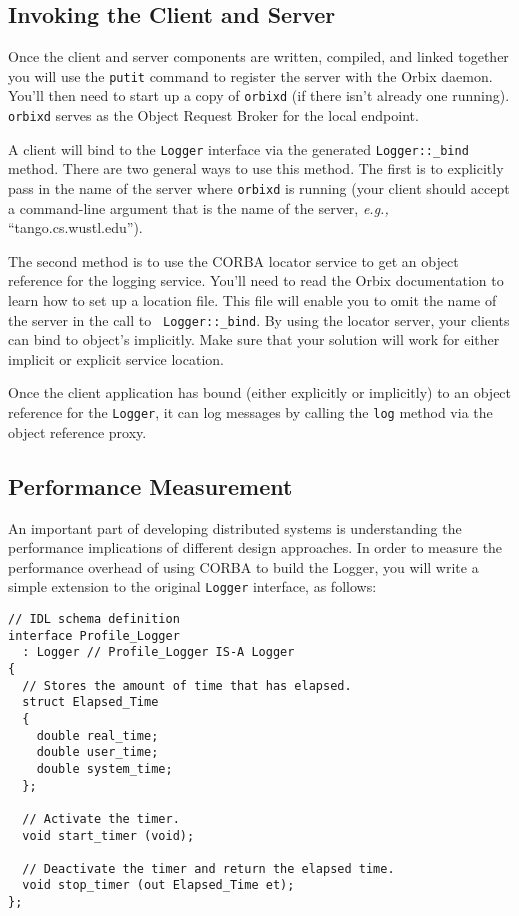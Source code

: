 \subsection{Invoking the Client and Server}
Once the client and server components are written, compiled, and
linked together you will use the {\tt putit} command to register the
server with the Orbix daemon.  You'll then need to start up a copy of
{\tt orbixd} (if there isn't already one running).  {\tt orbixd}
serves as the Object Request Broker for the local endpoint.

A client will bind to the {\tt Logger} interface via the generated
{\tt Logger::\_bind} method.  There are two general ways to use this
method.  The first is to explicitly pass in the name of the server
where {\tt orbixd} is running (your client should accept a
command-line argument that is the name of the server, {\em e.g.,}
``tango.cs.wustl.edu'').

The second method is to use the CORBA locator service to get an object
reference for the logging service.  You'll need to read the Orbix
documentation to learn how to set up a location file.  This file will
enable you to omit the name of the server in the call to {\tt
Logger::\_bind}.  By using the locator server, your clients can bind
to object's implicitly.  Make sure that your solution will work for
either implicit or explicit service location.

Once the client application has bound (either explicitly or
implicitly) to an object reference for the {\tt Logger}, it can log
messages by calling the {\tt log} method via the object reference
proxy.

\subsection{Performance Measurement}

An important part of developing distributed systems is understanding
the performance implications of different design approaches.  In order
to measure the performance overhead of using CORBA to build the
Logger, you will write a simple extension to the original {\tt Logger}
interface, as follows:

{
\small
{}
\begin{verbatim}
// IDL schema definition
interface Profile_Logger 
  : Logger // Profile_Logger IS-A Logger
{
  // Stores the amount of time that has elapsed.
  struct Elapsed_Time
  {
    double real_time;
    double user_time;
    double system_time;
  };
 
  // Activate the timer.
  void start_timer (void);

  // Deactivate the timer and return the elapsed time.
  void stop_timer (out Elapsed_Time et);
};
\end{verbatim}}

